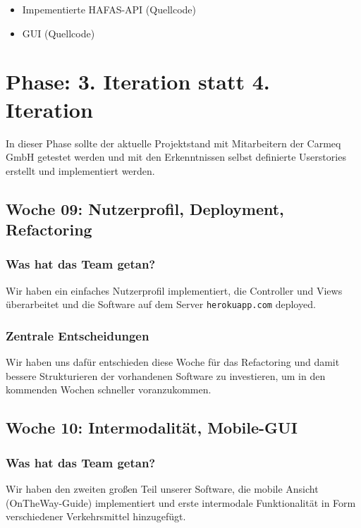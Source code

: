 \documentclass{article}
\begin{document}
\begin{itemize}
\item Impementierte HAFAS-API (Quellcode)
\item GUI (Quellcode)
\end{itemize}


\section{Phase: 3. Iteration statt 4. Iteration}

In dieser Phase sollte der aktuelle Projektstand mit Mitarbeitern der Carmeq GmbH getestet werden und mit den Erkenntnissen selbst definierte Userstories erstellt und implementiert werden.

\subsection{Woche 09: Nutzerprofil, Deployment, Refactoring}

\subsubsection{Was hat das Team getan?}

Wir haben ein einfaches Nutzerprofil implementiert, die Controller und Views \"uberarbeitet und die Software auf dem Server \texttt{herokuapp.com} deployed.

\subsubsection{Zentrale Entscheidungen}

Wir haben uns dafür entschieden diese Woche für das Refactoring und damit bessere Strukturieren der vorhandenen Software zu investieren, um in den kommenden Wochen schneller voranzukommen.

\subsection{Woche 10: Intermodalit\"at, Mobile-GUI}

\subsubsection{Was hat das Team getan?}

Wir haben den zweiten gro\ss en Teil unserer Software, die mobile Ansicht (OnTheWay-Guide) implementiert und erste intermodale Funktionalit\"at in Form verschiedener Verkehrsmittel hinzugef\"ugt.
\end{document}
